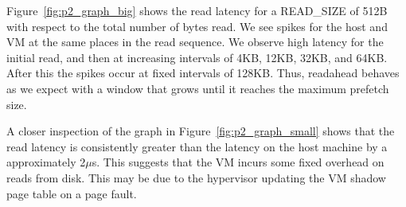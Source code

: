 Figure~\ref{fig:p2_graph_big} shows the read latency for a READ\_SIZE of 512B with
respect to the total number of bytes read. We see spikes for the host and VM at the
same places in the read sequence. We observe high latency for the initial read, and
then at increasing intervals of 4KB, 12KB, 32KB, and 64KB. After this the spikes 
occur at fixed intervals of 128KB. Thus, readahead behaves as we expect with a
window that grows until it reaches the maximum prefetch size.

A closer inspection of the graph in Figure~\ref{fig:p2_graph_small} shows that the 
read latency is consistently greater than the latency on the host machine by a 
approximately 2$\mu$s. This suggests that the VM incurs some fixed overhead on 
reads from disk. This may be due to the hypervisor updating the VM shadow page 
table on a page fault.




